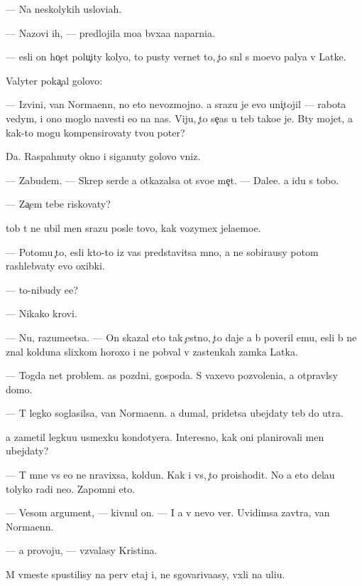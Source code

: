 \documentclass[10pt]{book}
\begin{document}
— Na neskolykih uslovi{\y}ah.

— Nazovi ih, — predlojila mo{\y}a b{\yi}vxa{\y}a naparni{\q}a.

— {\Y}esli on ho{\c}et polu{\c}ity koly{\q}o, to pusty vernet to, {\c}to sn{\ia}l s mo{\y}evo paly{\q}a v Latke.

Valyter poka{\c}al golovo{\y}:

— Izvini, van Norma{\y}enn, no eto nevozmojno. {\Y}a srazu je {\y}evo uni{\c}tojil — rabota vedym{\yi}, i ono moglo navesti {\y}e{\y}o na nas. Viju, {\c}to se{\y}{\c}as u teb{\ia} tako{\y}e je. B{\yi}ty mojet, {\y}a kak-to mogu kompensirovaty tvo{\y}u poter{\iu}?

Da. Raspahnuty okno i siganuty golovo{\y} vniz.

— Zabudem. — Skrep{\ia} serd{\q}e {\y}a otkazalsa ot svo{\y}e{\y} me{\c}t{\yi}. — Dale{\y}e. {\Y}a idu s tobo{\y}.

— Za{\c}em tebe riskovaty?

{\C}tob{\yi} t{\yi} ne ubil men{\ia} srazu posle tovo, kak vozymex jela{\y}emo{\y}e.

— Potomu {\c}to, {\y}esli kto-to iz vas predstavitsa mno{\y}, {\y}a ne sobira{\y}usy potom rashleb{\yi}vaty {\y}evo oxibki.

— {\C}to-nibudy {\y}e{\x}e?

— Nikako{\y} krovi.

— Nu, razume{\y}etsa. — On skazal eto tak {\c}estno, {\c}to daje {\y}a b{\yi} poveril {\y}emu, {\y}esli b{\yi} ne znal kolduna slixkom horoxo i ne pob{\yi}val v zastenkah zamka Latka.

— Togda net problem. {\C}as pozdni{\y}, gospoda. S vaxevo pozvoleni{\y}a, {\y}a otpravl{\iu}sy domo{\y}.

— T{\yi} legko soglasilsa, van Norma{\y}enn. {\Y}a dumal, pridetsa ubejdaty teb{\ia} do utra.

{\Y}a zametil legku{\y}u usmexku kondotyera. Interesno, kak oni planirovali men{\ia} ubejdaty?

— T{\yi} mne vs{\e} {\y}e{\x}o ne nravixsa, koldun. Kak i vs{\e}, {\c}to proishodit. No {\y}a eto dela{\y}u tolyko radi ne{\y}o. Zapomni eto.

— Vesom{\yi}{\y} argument, — kivnul on. — I {\y}a v nevo ver{\iu}. Uvidimsa zavtra, van Norma{\y}enn.

— {\Y}a provoju, — v{\yi}zvalasy Kristina.

M{\yi} vmeste spustilisy na perv{\yi}{\y} etaj i, ne sgovariva{\y}asy, v{\yi}xli na uli{\q}u.
\end{document}
